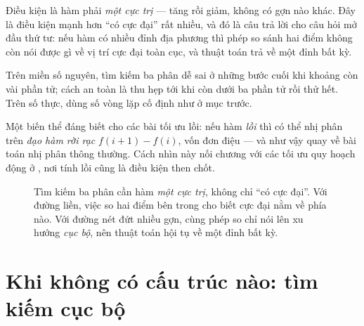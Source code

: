 \documentclass[../../algorithm.tex]{subfiles}
\begin{document}
Điều kiện là hàm phải \emph{một cực trị} --- tăng rồi giảm, không có gợn nào khác. Đây là điều kiện mạnh hơn ``có cực đại'' rất nhiều, và đó là câu trả lời cho câu hỏi mở đầu thứ tư: nếu hàm có nhiều đỉnh địa phương thì phép so sánh hai điểm không còn nói được gì về vị trí cực đại toàn cục, và thuật toán trả về một đỉnh bất kỳ.

Trên miền số nguyên, tìm kiếm ba phân dễ sai ở những bước cuối khi khoảng còn vài phần tử; cách an toàn là thu hẹp tới khi còn dưới ba phần tử rồi thử hết. Trên số thực, dùng số vòng lặp cố định như ở mục trước.

Một biến thể đáng biết cho các bài tối ưu lồi: nếu hàm \emph{lồi} thì có thể nhị phân trên \emph{đạo hàm rời rạc} \(f(i+1)-f(i)\), vốn đơn điệu --- và như vậy quay về bài toán nhị phân thông thường. Cách nhìn này nối chương với các tối ưu quy hoạch động ở , nơi tính lồi cũng là điều kiện then chốt.

\begin{figure}[H]\centering
{}
\caption{Tìm kiếm ba phân cần hàm \emph{một cực trị}, không chỉ ``có cực đại''. Với đường liền, việc so hai điểm bên trong cho biết cực đại nằm về phía nào. Với đường nét đứt nhiều gợn, cùng phép so chỉ nói lên xu hướng \emph{cục bộ}, nên thuật toán hội tụ về một đỉnh bất kỳ.}
\label{fig:ternary}
\end{figure}

\section{Khi không có cấu trúc nào: tìm kiếm cục bộ}
\end{document}
